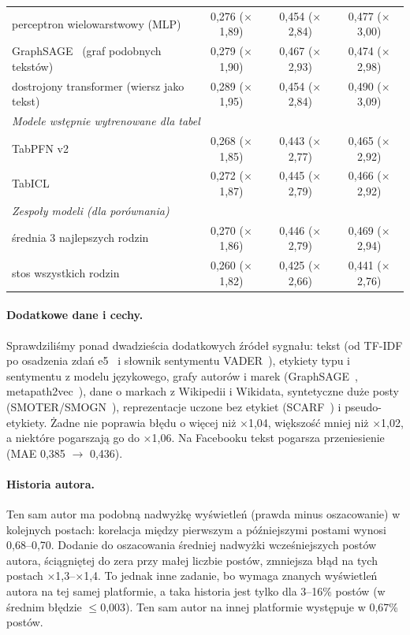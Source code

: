 \documentclass[10pt,a4paper]{article}
\newcommand{\x}[1]{$\times$#1}
\begin{document}
\begin{table}[!htb]
\begin{tabular}{lccc}
\quad perceptron wielowarstwowy (MLP) & 0,276 (\x{1,89}) & 0,454 (\x{2,84}) & 0,477 (\x{3,00}) \\
\quad GraphSAGE~\cite{graphsage} (graf podobnych tekstów) & 0,279 (\x{1,90}) & 0,467 (\x{2,93}) & 0,474 (\x{2,98}) \\
\quad dostrojony transformer (wiersz jako tekst) & 0,289 (\x{1,95}) & 0,454 (\x{2,84}) & 0,490 (\x{3,09}) \\
\multicolumn{4}{l}{\textit{Modele wstępnie wytrenowane dla tabel}} \\
\quad TabPFN v2 & 0,268 (\x{1,85}) & 0,443 (\x{2,77}) & 0,465 (\x{2,92}) \\
\quad TabICL~\cite{tabicl} & 0,272 (\x{1,87}) & 0,445 (\x{2,79}) & 0,466 (\x{2,92}) \\
\midrule
\multicolumn{4}{l}{\textit{Zespoły modeli (dla porównania)}} \\
\quad średnia 3 najlepszych rodzin & 0,270 (\x{1,86}) & 0,446 (\x{2,79}) & 0,469 (\x{2,94}) \\
\quad stos wszystkich rodzin & 0,260 (\x{1,82}) & 0,425 (\x{2,66}) & 0,441 (\x{2,76}) \\
\bottomrule
\end{tabular}
\end{table}

\paragraph{Dodatkowe dane i cechy.} Sprawdziliśmy ponad dwadzieścia dodatkowych źródeł sygnału: tekst (od TF-IDF po
osadzenia zdań e5~\cite{e5} i słownik sentymentu VADER~\cite{vader}), etykiety typu i sentymentu z modelu językowego,
grafy autorów i marek (GraphSAGE~\cite{graphsage}, metapath2vec~\cite{metapath2vec}), dane o markach z Wikipedii
i Wikidata, syntetyczne duże posty (SMOTER/SMOGN~\cite{smogn}), reprezentacje uczone bez etykiet (SCARF~\cite{scarf})
i pseudo-etykiety. Żadne nie poprawia błędu o więcej niż \x{1,04}, większość mniej niż \x{1,02}, a niektóre pogarszają
go do \x{1,06}. Na Facebooku tekst pogarsza przeniesienie (MAE 0,385 $\to$ 0,436).

\paragraph{Historia autora.} Ten sam autor ma podobną nadwyżkę wyświetleń (prawda minus oszacowanie) w kolejnych
postach: korelacja między pierwszym a późniejszymi postami wynosi 0,68--0,70. Dodanie do oszacowania średniej nadwyżki
wcześniejszych postów autora, ściągniętej do zera przy małej liczbie postów, zmniejsza błąd na tych postach
\x{1,3}--\x{1,4}. To jednak inne zadanie, bo wymaga znanych wyświetleń autora na tej samej platformie, a taka historia
jest tylko dla 3--16\% postów (w średnim błędzie $\le$0,003). Ten sam autor na innej platformie występuje w 0,67\% postów.
\end{document}
